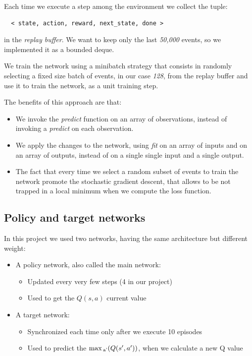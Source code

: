 \documentclass{article}
\begin{document}
Each time we execute a step among the environment we collect the tuple:

\begin{verbatim}
  < state, action, reward, next_state, done >
\end{verbatim}

in the \emph{replay buffer}.
We want to keep only the last \emph{50,000} events, so we implemented it as a bounded deque.

We train the network using a minibatch strategy that consists
in randomly selecting a fixed size batch of events,
in our case \emph{128}, from the replay buffer and use it to train the network,
as a unit training step.

The benefits of this approach are that:

\begin{itemize}
  \item We invoke the \emph{predict} function on an array of observations, instead of invoking a \emph{predict} on each observation.
  \item We apply the changes to the network, using \emph{fit} on an array of inputs and on an array of outputs, 
  instead of on a single single input and a single output.
  \item The fact that every time we select a random subset of events 
  to train the network promote the stochastic gradient descent, that allows
  to be not trapped in a local minimum when we compute the loss function.
\end{itemize}

\subsection{Policy and target networks}

In this project we used two networks, having the same architecture but different weight:

\begin{itemize}
  \item A policy network, also called the main network:
  \begin{itemize}
    \item{Updated every very few steps (4 in our project)}
    \item {Used to get the $Q(s,a)$ current value}
  \end{itemize}   
  \item A target network:
  \begin{itemize}
    \item{Synchronized each time only after we execute 10 episodes}
    \item{Used to predict the $\max\textsubscript{a'} (Q(s',a'))$, when we calculate a new Q value}
  \end{itemize} 
\end{itemize}
\end{document}
